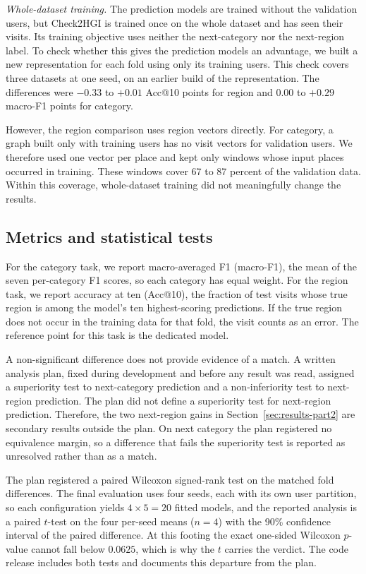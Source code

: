 \emph{Whole-dataset training.} The prediction models are trained without the validation users, but Check2HGI is trained once on the whole dataset and has seen their visits. Its training objective uses neither the next-category nor the next-region label. To check whether this gives the prediction models an advantage, we built a new representation for each fold using only its training users. This check covers three datasets at
one seed, on an earlier build of the representation.
The differences were $-0.33$ to $+0.01$ Acc@10 points for region and $0.00$ to
$+0.29$ macro-F1 points for category.

However, the region comparison uses region vectors directly. For category, a graph built only
with training users has no visit vectors for validation users. We therefore used one
vector per place and kept only windows whose input places occurred in training. These
windows cover 67 to 87 percent of the validation data. Within this
coverage, whole-dataset training did not meaningfully change the results.


\subsection{Metrics and statistical tests}
\label{sec:setup-metrics}
For the category task, we report macro-averaged F1 (macro-F1), the mean of the seven per-category F1 scores, so each category has equal weight. For the region task, we report accuracy at ten (Acc@10), the fraction of test visits whose true region is among the model's ten highest-scoring predictions. If the true region does not occur in the training data for that fold, the visit counts as an error. The reference point for this task is the dedicated model.

A non-significant difference does not provide evidence of a match. A written analysis plan, fixed during development and before any result was read, assigned a superiority test to next-category prediction and a non-inferiority test to next-region prediction. The plan did not define a superiority test for next-region prediction. Therefore, the two next-region gains in Section~\ref{sec:results-part2} are secondary results outside the plan. On next category the plan registered no equivalence margin, so a difference that fails the superiority test is reported as unresolved rather than as a match.

The plan registered a paired Wilcoxon signed-rank test on the matched fold differences. The final
evaluation uses four seeds, each with its own user partition, so each configuration yields
$4\times5=20$ fitted models, and the reported analysis is a paired $t$-test on the four per-seed
means ($n{=}4$) with the 90\% confidence interval of the paired difference. At this footing the
exact one-sided Wilcoxon $p$-value cannot fall below $0.0625$, which is why the $t$ carries the
verdict. The code release includes both tests and documents this departure from the plan.


